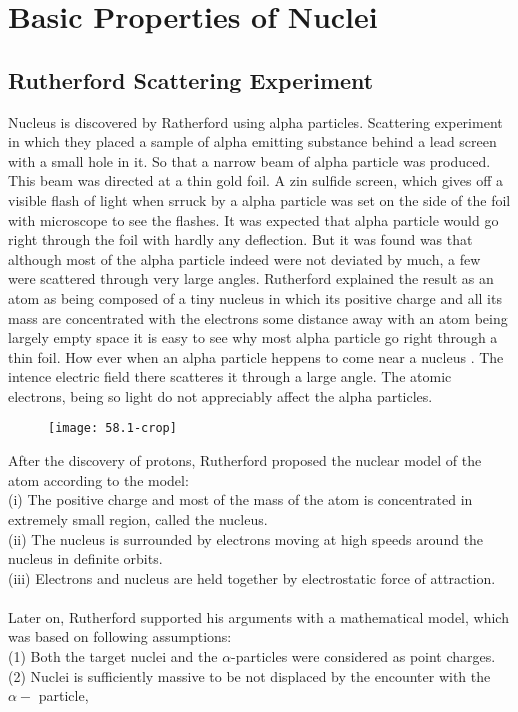 \chapter{Basic Properties of Nuclei}
\section{Rutherford Scattering Experiment}
Nucleus is discovered by Ratherford using alpha particles. Scattering experiment in which they placed a sample of alpha emitting substance behind a lead screen with a small hole in it. So that a narrow beam of alpha particle was produced. This beam was directed at a thin gold foil. A zin sulfide screen, which gives off a visible flash of light when srruck by a alpha particle was set on the side of the foil with microscope to see the flashes. It was expected that alpha particle would go right through the foil with hardly any deflection. But it was found was that although most of the alpha particle indeed were not deviated by much, a few were scattered through very large angles. Rutherford explained the result as an atom as being composed of a tiny nucleus in which its positive charge and all its mass are concentrated with the electrons some distance away with an atom being largely empty space it is easy to see why most alpha particle go right through a thin foil. How ever when an alpha particle heppens to come near a nucleus . The intence electric field there scatteres it through a large angle. The atomic electrons, being so light do not appreciably affect the alpha particles.\\

	\begin{figure}[H]
		\centering
		\texttt{[image: 58.1-crop]}
		\caption{}
		\label{}
	\end{figure}
After the discovery of protons, Rutherford proposed the nuclear model of the atom according to the model:\\
(i) The positive charge and most of the mass of the atom is concentrated in extremely small region, called the nucleus.\\
(ii) The nucleus is surrounded by electrons moving at high speeds around the nucleus in definite orbits.\\
(iii) Electrons and nucleus are held together by electrostatic force of attraction.\\\\
Later on, Rutherford supported his arguments with a mathematical model, which was based on following assumptions:\\
(1) Both the target nuclei and the $\alpha$-particles were considered as point charges.\\
(2) Nuclei is sufficiently massive to be not displaced by the encounter with the $\alpha-$ particle,\\
